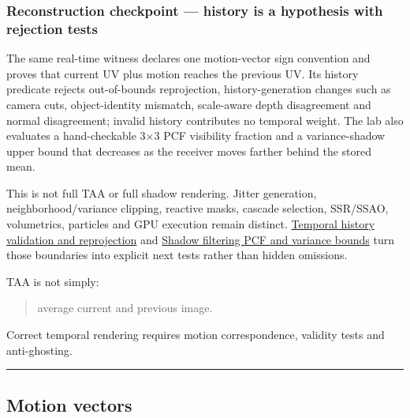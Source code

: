 \hypertarget{04-visual-computing-ii-ch040-temporal-rendering-and-post}{}

\subsubsection{Reconstruction checkpoint --- history is a hypothesis with rejection tests}\label{04-visual-computing-ii-ch040-reconstruction-checkpoint-history-is-a-hypothesis-with-rejection-tests}

\hypertarget{04-visual-computing-ii-ch040-reconstruction-checkpoint-history-is-a-hypothesis-with-rejection-tests}{}

The same real-time witness declares one motion-vector sign convention and proves that current UV plus motion reaches the previous UV. Its history predicate rejects out-of-bounds reprojection, history-generation changes such as camera cuts, object-identity mismatch, scale-aware depth disagreement and normal disagreement; invalid history contributes no temporal weight. The lab also evaluates a hand-checkable 3×3 PCF visibility fraction and a variance-shadow upper bound that decreases as the receiver moves farther behind the stored mean.

This is not full TAA or full shadow rendering. Jitter generation, neighborhood/variance clipping, reactive masks, cascade selection, SSR/SSAO, volumetrics, particles and GPU execution remain distinct. \hyperref[appendix-e8c352e39466]{Temporal history validation and reprojection} and \hyperref[appendix-7cac8a689849]{Shadow filtering PCF and variance bounds} turn those boundaries into explicit next tests rather than hidden omissions.

TAA is not simply:

\begin{quote}
average current and previous image.
\end{quote}

Correct temporal rendering requires motion correspondence, validity tests and anti-ghosting.

\begin{center}\rule{0.5\linewidth}{0.5pt}\end{center}

\subsection{Motion vectors}\label{04-visual-computing-ii-ch040-motion-vectors}

\hypertarget{04-visual-computing-ii-ch040-motion-vectors}{}

